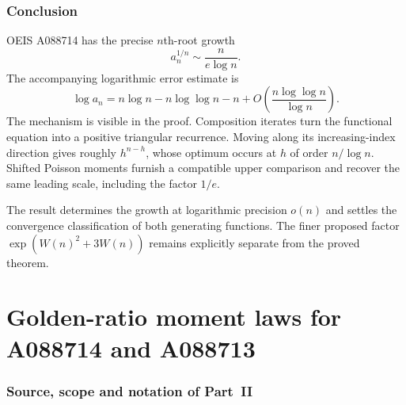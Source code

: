 \documentclass[11pt]{article}
\numberwithin{equation}{section}
\theoremstyle{definition}
\theoremstyle{remark}
\begin{document}
\section{Conclusion}

OEIS A088714 has the precise $n$th-root growth
\[
 \boxed{a_n^{1/n}\sim\frac{n}{e\log n}.}
\]
The accompanying logarithmic error estimate is
\[
 \log a_n=n\log n-n\log\log n-n
       +O\!\left(\frac{n\log\log n}{\log n}\right).
\]
The mechanism is visible in the proof. Composition iterates turn the
functional equation into a positive triangular recurrence. Moving along
its increasing-index direction gives roughly $h^{n-h}$, whose optimum
occurs at $h$ of order $n/\log n$. Shifted Poisson moments furnish a
compatible upper comparison and recover the same leading scale,
including the factor $1/e$.

The result determines the growth at logarithmic precision $o(n)$ and
settles the convergence classification of both generating functions.
The finer proposed factor $\exp(W(n)^2+3W(n))$ remains explicitly
separate from the proved theorem.

\clearpage
\part{Golden-ratio moment laws for A088714 and A088713}\label{gml:part}

\section{Source, scope and notation of Part~II}\label{gml:sec:source}
\end{document}
